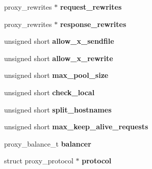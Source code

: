 \begin{CompactItemize}
\item 
\hypertarget{structplugin__config_a7f8b417d0e9faeb9df73de6e26a9508}{
proxy\_\-rewrites $\ast$ \textbf{request\_\-rewrites}}
\label{structplugin__config_a7f8b417d0e9faeb9df73de6e26a9508}

\item 
\hypertarget{structplugin__config_333223212c27619c6e103ce23c90024e}{
proxy\_\-rewrites $\ast$ \textbf{response\_\-rewrites}}
\label{structplugin__config_333223212c27619c6e103ce23c90024e}

\item 
\hypertarget{structplugin__config_276fbfe9afa48c542130c1e9e959edc2}{
unsigned short \textbf{allow\_\-x\_\-sendfile}}
\label{structplugin__config_276fbfe9afa48c542130c1e9e959edc2}

\item 
\hypertarget{structplugin__config_b9436c96cfd198d89cc003ecd8847780}{
unsigned short \textbf{allow\_\-x\_\-rewrite}}
\label{structplugin__config_b9436c96cfd198d89cc003ecd8847780}

\item 
\hypertarget{structplugin__config_788cd252dad57bbbc61c2b02d7231674}{
unsigned short \textbf{max\_\-pool\_\-size}}
\label{structplugin__config_788cd252dad57bbbc61c2b02d7231674}

\item 
\hypertarget{structplugin__config_f534be9f6bf0ff2b139b653206ee13df}{
unsigned short \textbf{check\_\-local}}
\label{structplugin__config_f534be9f6bf0ff2b139b653206ee13df}

\item 
\hypertarget{structplugin__config_ee8fbf3b1e55457419401116281a53bf}{
unsigned short \textbf{split\_\-hostnames}}
\label{structplugin__config_ee8fbf3b1e55457419401116281a53bf}

\item 
\hypertarget{structplugin__config_8e959bc85e9f8c7b4db3d10dba6708e0}{
unsigned short \textbf{max\_\-keep\_\-alive\_\-requests}}
\label{structplugin__config_8e959bc85e9f8c7b4db3d10dba6708e0}

\item 
\hypertarget{structplugin__config_c4f0cd0d905bca88acb00016507fe5d1}{
proxy\_\-balance\_\-t \textbf{balancer}}
\label{structplugin__config_c4f0cd0d905bca88acb00016507fe5d1}

\item 
\hypertarget{structplugin__config_4440ae76d0d9615f789f70f1062ed989}{
struct proxy\_\-protocol $\ast$ \textbf{protocol}}
\label{structplugin__config_4440ae76d0d9615f789f70f1062ed989}


\end{CompactItemize}
